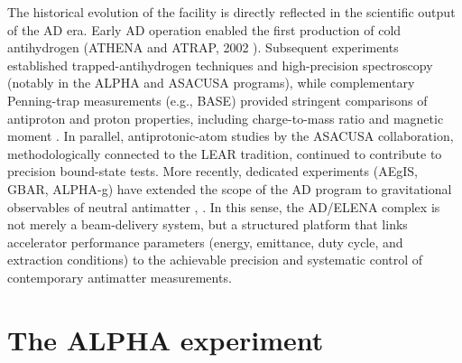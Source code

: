 The historical evolution of the facility is directly reflected in the scientific output of the AD era. Early AD operation enabled the first production of cold antihydrogen (ATHENA and ATRAP, 2002 \cite{Amoretti2002}). Subsequent experiments established trapped-antihydrogen techniques and high-precision spectroscopy (notably in the ALPHA and ASACUSA programs), while complementary Penning-trap measurements (e.g., BASE) provided stringent comparisons of antiproton and proton properties, including charge-to-mass ratio and magnetic moment \cite{Ulmer2015}. In parallel, antiprotonic-atom studies by the ASACUSA collaboration, methodologically connected to the LEAR tradition, continued to contribute to precision bound-state tests. More recently, dedicated experiments (AEgIS, GBAR, ALPHA-g) have extended the scope of the AD program to gravitational observables of neutral antimatter \cite{Aegisproposal}, \cite{GBAR:2011fij} \cite{ALPHA:2013skd}. In this sense, the AD/ELENA complex is not merely a beam-delivery system, but a structured platform that links accelerator performance parameters (energy, emittance, duty cycle, and extraction conditions) to the achievable precision and systematic control of contemporary antimatter measurements.

\section{The ALPHA experiment}

